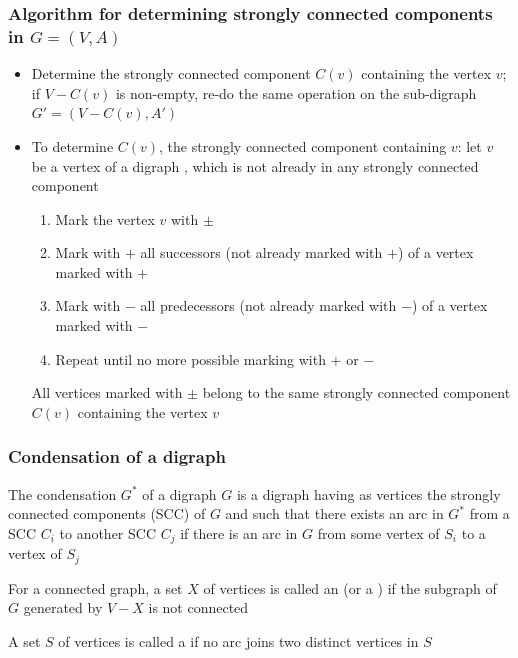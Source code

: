 \documentclass[aspectratio=169]{beamer}\usepackage[]{graphicx}\usepackage[]{xcolor}
\begin{document}
\begin{frame}\frametitle{Algorithm for determining strongly connected components in $G=(V,A)$}
	\begin{itemize}
	\item Determine the strongly connected component $C(v)$ containing the vertex $v$; if $V-C(v)$ is non-empty, re-do the same operation on the sub-digraph $G'=(V-C(v),A')$
	\item To determine $C(v)$, the strongly connected component containing $v$: let $v$ be a vertex of a digraph , which is not already in any strongly connected component
	\begin{enumerate}
	\item Mark the vertex $v$ with $\pm$
	\item Mark with $+$ all successors (not already marked with $+$) of a vertex marked with $+$
	\item Mark with $-$ all predecessors (not already marked with $-$) of a vertex marked with $-$
	\item Repeat until no more possible marking with $+$ or $-$
	\end{enumerate}
	All vertices marked with $\pm$ belong to the same strongly connected component $C(v)$ containing the vertex $v$
	\end{itemize}
\end{frame}

\begin{frame}\frametitle{Condensation of a digraph}
	\begin{definition}
		The condensation $G^*$ of a digraph $G$ is a digraph having as vertices the strongly connected components (SCC) of $G$ and such that there exists an arc in $G^*$ from a SCC $C_i$ to another SCC $C_j$ if there is an arc in $G$ from some vertex of $S_i$ to a vertex of $S_j$
	\end{definition}
\end{frame}


\begin{frame} 
	\begin{definition}
		For a connected graph, a set $X$ of vertices is called an  (or a ) if the subgraph of $G$ generated by $V-X$ is not connected
	\end{definition}
	\vfill
	\begin{definition}
		A set $S$ of vertices is called a  if no arc joins two distinct vertices in $S$
	\end{definition}
	\vfill
\end{frame}
\end{document}
